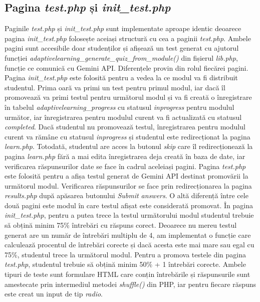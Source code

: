 \subsection{Pagina \textit{test.php} și \textit{init\_test.php}}
Paginile \textit{test.php} și \textit{init\_test.php} sunt implementate aproape identic deoarece pagina \textit{init\_test.php} folosește aceiași structură cu cea a paginii \textit{test.php}. 
Ambele pagini sunt accesibile doar studenților și afișează un test generat cu ajutorul funcției \textit{adaptivelearning\_generate\_quiz\_from\_module()} din fișierul \textit{lib.php}, 
funcție ce comunică cu Gemini API. Diferențele provin din rolul fiecărei pagini. Pagina \textit{init\_test.php} este folosită pentru a vedea la ce modul va fi distribuit studentul. Prima 
oară va primi un test pentru primul modul, iar dacă îl promovează va primi testul pentru următorul modul și va fi creată o înregistrare în tabelul \textit{adaptivelearning\_progress} 
cu statusul \textit{inprogress} pentru modulul următor, iar înregistrarea pentru modulul curent va fi actualizată cu statusul \textit{completed}. Dacă studentul nu promovează testul,
înregistrarea pentru modulul curent va rămâne cu statusul \textit{inprogress} și studentul este redirecționat la pagina \textit{learn.php}. Totodată, studentul are acces la butonul 
\textit{skip} care îl redirecționează la pagina \textit{learn.php} fără a mai edita înregistrarea deja creată în baza de date, iar verificarea răspunsurilor date se face în cadrul 
aceleiași pagini. Pagina \textit{test.php} este folosită pentru a afișa testul generat de Gemini API destinat promovării la următorul modul. Verificarea răspunsurilor se face prin 
redirecționarea la pagina \textit{results.php} după apăsarea butonului \textit{Submit answers}. O altă diferență între cele două pagini este modul în care testul afișat este considerată
promovat. În pagina \textit{init\_test.php}, pentru a putea trece la testul următorului modul studentul trebuie să obțină minim 75\% întrebări cu răspuns corect. Deoarece nu mereu testul 
generat are un număr de întrebări multiplu de 4, am implementat o funcție care calculează procentul de întrebări corecte și dacă acesta este mai mare sau egal cu 75\%, studentul
trece la următorul modul. Pentru a promova testele din pagina \textit{test.php}, studentul trebuie să obțină minim 50\% + 1 întrebări corecte. Ambele tipuri de teste sunt formulare HTML
care conțin întrebările și răspunsurile sunt amestecate prin intermediul metodei \textit{shuffle()} din PHP, iar pentru fiecare răspuns este creat un input de tip \textit{radio}.

